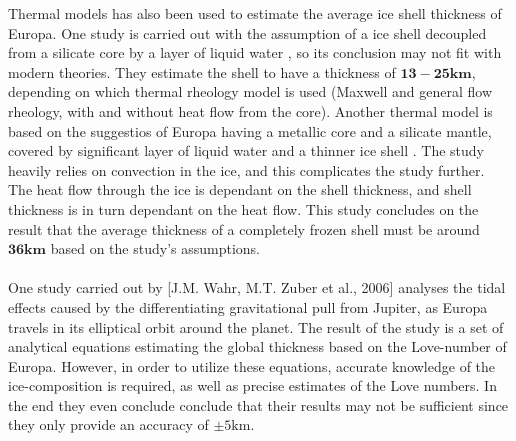 Thermal models has also been used to estimate the average ice shell thickness of Europa. One study is carried out with the assumption of a ice shell decoupled from a silicate core by a layer of liquid water \cite{ThermThick}, so its conclusion may not fit with modern theories. They estimate the shell to have a thickness of $\mathbf{13-25km}$, depending on which thermal rheology model is used (Maxwell and general flow rheology, with and without heat flow from the core). Another thermal model is based on the suggestios of Europa having a metallic core and a silicate mantle, covered by significant layer of liquid water and a thinner ice shell \cite{ThermThick2}. The study heavily relies on convection in the ice, and this complicates the study further. The heat flow through the ice is dependant on the shell thickness, and shell thickness is in turn dependant on the heat flow. This study concludes on the result that the average thickness of a completely frozen shell must be around $\mathbf{36km}$ based on the study's assumptions.
\\
\\ One study carried out by [J.M. Wahr, M.T. Zuber et al., 2006] analyses the tidal effects caused by the differentiating gravitational pull from Jupiter, as Europa travels in its elliptical orbit around the planet. The result of the study is a set of analytical equations estimating the global thickness based on the Love-number of Europa. However, in order to utilize these equations, accurate knowledge of the ice-composition is required, as well as precise estimates of the Love numbers. In the end they even conclude conclude that their results may not be sufficient since they only provide an accuracy of $\pm 5\mathrm{km}$.\\
\\
